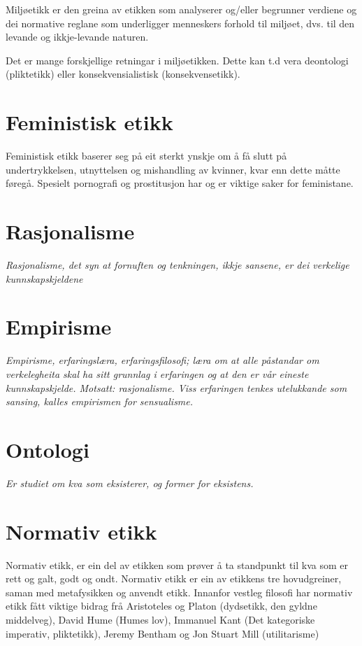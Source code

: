 \documentclass[a4paper]{IEEEtran}
\begin{document}
Miljøetikk er den greina av etikken som analyserer og/eller begrunner verdiene og dei normative reglane som underligger menneskers forhold til miljøet, dvs. til den levande og ikkje-levande naturen.\bigskip

Det er mange forskjellige retningar i miljøetikken. Dette kan t.d vera deontologi (pliktetikk) eller konsekvensialistisk (konsekvensetikk). 

\section{Feministisk etikk}
\label{femimisme}\bigskip

Feministisk etikk baserer seg på eit sterkt ynskje om å få slutt på undertrykkelsen, utnyttelsen og mishandling av kvinner, kvar enn dette måtte føregå. Spesielt pornografi og prostitusjon har og er viktige saker for feministane. 

\section{Rasjonalisme}
\label{rasjonalisme}\bigskip

\textit{Rasjonalisme, det syn at fornuften og tenkningen, ikkje sansene, er dei verkelige kunnskapskjeldene}

\section{Empirisme}
\label{empirisme}\bigskip

\textit{Empirisme, erfaringslæra, erfaringsfilosofi; læra om at alle påstandar om verkelegheita skal ha sitt grunnlag i erfaringen og at den er vår eineste kunnskapskjelde. Motsatt: rasjonalisme. Viss erfaringen tenkes utelukkande som sansing, kalles empirismen for sensualisme.}
\section{Ontologi}
\label{ontolog}\bigskip

\textit{Er studiet om kva som eksisterer, og former for eksistens.}
\bigskip

\section{Normativ etikk}
\label{normativetikk}\bigskip

Normativ etikk, er ein del av etikken som prøver å ta standpunkt til kva som er rett og galt, godt og ondt. Normativ etikk er ein av etikkens tre hovudgreiner, saman med metafysikken og anvendt etikk. Innanfor vestleg filosofi har normativ etikk fått viktige bidrag frå Aristoteles og Platon (dydsetikk, den gyldne middelveg), David Hume (Humes lov), Immanuel Kant (Det kategoriske imperativ, pliktetikk), Jeremy Bentham og Jon Stuart Mill (utilitarisme)
\bigskip
\end{document}
